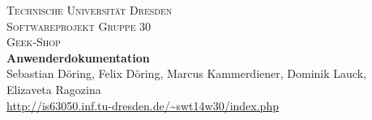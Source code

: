 \begin{titlepage}
\begin{center}
\textsc{\LARGE Technische Universit\"at Dresden} \\[0.5cm]
\textsc{\LARGE Softwareprojekt Gruppe 30}\\[0.5cm]
\textsc{\LARGE Geek-Shop}\\[3cm]
{\Huge \bfseries Anwenderdokumentation}\\
\vspace*{\fill}
Sebastian D\"oring, Felix D\"oring, Marcus Kammerdiener, Dominik Lauck, Elizaveta Ragozina\\[0.5cm]
\url{http://is63050.inf.tu-dresden.de/~swt14w30/index.php}
\end{center}
\end{titlepage}
